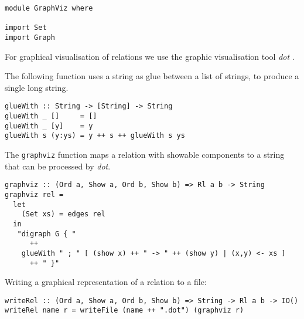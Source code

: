 \bc\begin{verbatim} 
module GraphViz where 

import Set
import Graph
\end{verbatim}\ec 

For graphical visualisation of relations we use the graphic
visualisation tool {\em dot} \cite{KouNor:dgwd}.

The following function uses a string as glue between a list of 
strings, to produce a single long string. 

\bc\begin{verbatim} 
glueWith :: String -> [String] -> String
glueWith _ []     = []
glueWith _ [y]    = y
glueWith s (y:ys) = y ++ s ++ glueWith s ys
\end{verbatim}\ec

The \verb^graphviz^ function maps a relation with showable 
components to a string that can be processed by {\em dot}. 

\bc\begin{verbatim} 
graphviz :: (Ord a, Show a, Ord b, Show b) => Rl a b -> String
graphviz rel = 
  let 
    (Set xs) = edges rel 
  in 
   "digraph G { " 
      ++
    glueWith " ; " [ (show x) ++ " -> " ++ (show y) | (x,y) <- xs ]
      ++ " }"
\end{verbatim}\ec

Writing a graphical representation of a relation to a file:  

\bc\begin{verbatim}
writeRel :: (Ord a, Show a, Ord b, Show b) => String -> Rl a b -> IO()
writeRel name r = writeFile (name ++ ".dot") (graphviz r)
\end{verbatim}\ec



